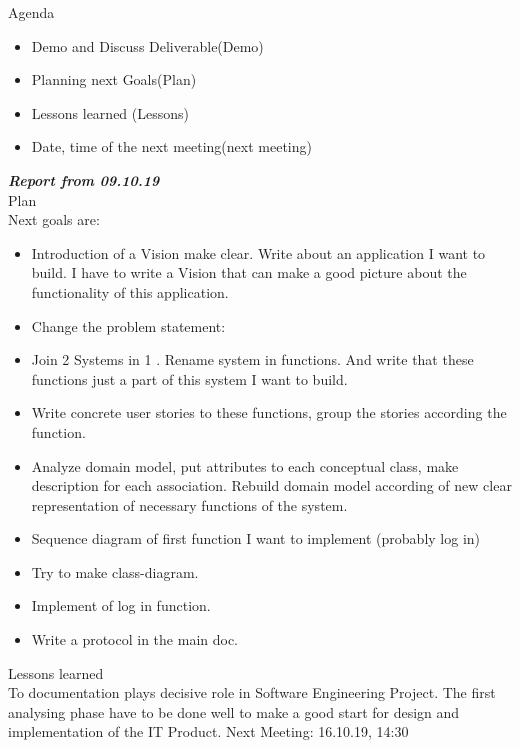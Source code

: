 \documentclass{scrartcl}
\begin{document}
Agenda

\begin{itemize}
  	\item Demo and Discuss Deliverable(Demo)
  	\item Planning next Goals(Plan)
  	\item Lessons learned (Lessons)
  	\item Date, time of the next meeting(next meeting)
 \end{itemize} 	


\textbf{\textit{Report from 09.10.19}}\\
Plan\\
Next goals are: 
\begin{itemize}


	\item Introduction of a Vision make clear. Write about an application I want to build. I have to write a Vision that can make a good picture about the functionality of this application.
	\item	Change the problem statement: 
	\item	Join 2 Systems in 1 . Rename system in functions. And write that these functions just a part of this system I want to build. 
	\item	Write concrete user stories to these functions, group the stories according the function.
	\item	Analyze domain model, put attributes to each conceptual class, make description for each association. Rebuild domain model according of new clear representation of necessary functions of the system.
	\item	Sequence diagram of first function I want to implement (probably log in)
	\item	Try to make class-diagram.
	\item	Implement of log in function.
	\item	Write a protocol in the main doc.
\end{itemize}	
Lessons learned\\
To documentation plays decisive role in Software Engineering Project. The first analysing phase have to be done well to make a good start for design and implementation of the IT Product.
Next Meeting: 16.10.19, 14:30\\
\end{document}
